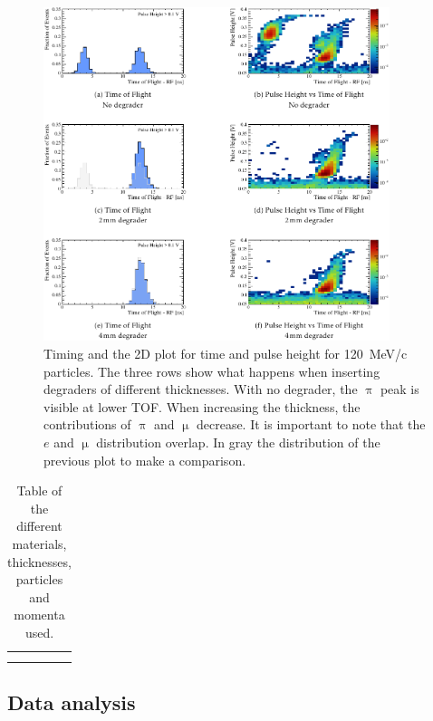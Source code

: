 \begin{refsection}
        \begin{figure}
            \centering
            \includegraphics[width=0.9\textwidth]{Figures/muEDM_Dec2021/muEDM_beamtime2021_TOF.png}
            \caption{Timing and the 2D plot for time and pulse height for \SI{120}{MeV/c} particles. The three rows show what happens when inserting degraders of different thicknesses.
            With no degrader, the $\uppi$ peak is visible at lower TOF.
            When increasing the thickness, the contributions of $\uppi$ and $\upmu$ decrease.
            It is important to note that the $e$ and $\upmu$ distribution overlap.
            In gray the distribution of the previous plot to make a comparison.}
            \label{fig:muEDM:beamtime2021:TOF}
        \end{figure}

        \begin{table}[]
            \centering
            \begin{tabular}{c|c}
                 &  \\
                 & 
            \end{tabular}
            \caption{Table of the different materials, thicknesses, particles and momenta used.}
            \label{tab:my_label}
        \end{table}

    \subsection{Data analysis}

\end{refsection}

